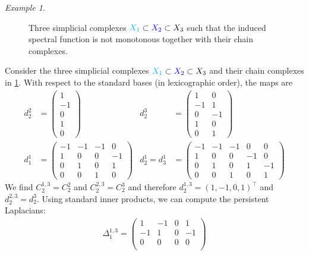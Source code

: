 \documentclass[11pt]{article}
\theoremstyle{definition}
\theoremstyle{remark}
\newtheorem{example}[theorem]{Example}
\newcommand{\R}{\mathbb{R}}
\begin{document}
\begin{example}
\begin{figure}
    \caption{Three simplicial complexes $\textcolor{skyblue}{X_1} \subset \textcolor{blue}{X_2} \subset X_3$ such that the induced spectral function is not monotonous together with their chain complexes.} 
    \label{fig:nofullmon2}
\end{figure}
    Consider the three simplicial complexes $\textcolor{skyblue}{X_1} \subset \textcolor{blue}{X_2} \subset X_3$ and their chain complexes in \cref{fig:nofullmon2}. With respect to the standard bases (in lexicographic order), the maps are
    \begin{align*}
        d_2^2&=\begin{pmatrix}
            1 \\ -1 \\ 0 \\ 1 \\ 0 
        \end{pmatrix} &d_2^3&=\begin{pmatrix}
            1 & 0\\ -1 & 1\\ 0 & -1\\ 1 &0\\ 0& 1 
        \end{pmatrix}\\
        d_1^1&=\begin{pmatrix}
            -1 & -1 & -1 & 0 \\ 1&0&0&-1 \\ 0&1&0&1 \\ 0&0&1&0 
        \end{pmatrix} 
        & d_2^1=d_3^1&=\begin{pmatrix}
            -1 & -1 & -1 & 0 &0\\ 1&0&0&-1&0 \\ 0&1&0&1&-1 \\ 0&0&1&0&1 
        \end{pmatrix}
    \end{align*}
    We find $C_2^{1,3}=C_2^2$ and $C_2^{2,3}=C_2^3$ and therefore $d_{2}^{1,3}=(1,-1,0,1)^\top$ and $d_{2}^{2,3}=d_2^3$. Using standard inner products, we can compute the persistent Laplacians:
    \begin{align*}
        \Delta_1^{1,3}=\begin{pmatrix}
            1&-1&0&1\\
            -1&1&0&-1\\
            0&0&0&0\\

\end{pmatrix}
\end{align*}
\end{example}
\end{document}
